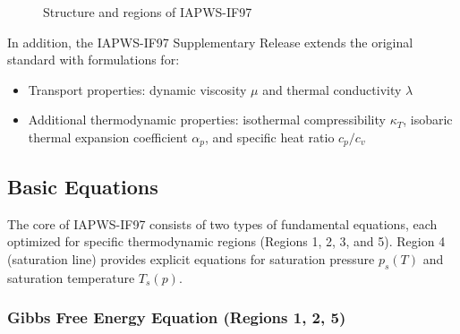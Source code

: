 \documentclass{article}
\begin{document}
\begin{figure}[H]
\caption{Structure and regions of IAPWS-IF97}
\label{fig:if97_regions}
\end{figure}

In addition, the IAPWS-IF97 Supplementary Release \cite{IAPWS-Supplementary} extends the original standard with formulations for:
\begin{itemize}
    \item Transport properties: dynamic viscosity $\mu$ and thermal conductivity $\lambda$
    \item Additional thermodynamic properties: isothermal compressibility $\kappa_T$, isobaric thermal expansion coefficient $\alpha_p$, and specific heat ratio $c_p/c_v$
\end{itemize}

\subsection{Basic Equations}

The core of IAPWS-IF97 consists of two types of fundamental equations, each optimized for specific thermodynamic regions (Regions 1, 2, 3, and 5). Region 4 (saturation line) provides explicit equations for saturation pressure $p_s(T)$ and saturation temperature $T_s(p)$.

\subsubsection{Gibbs Free Energy Equation (Regions 1, 2, 5)}
\end{document}
